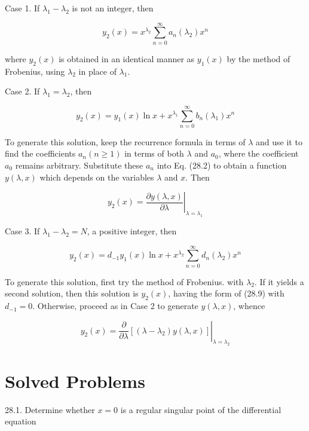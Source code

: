 \documentclass[10pt]{article}
\begin{document}
Case 1. If $\lambda_{1}-\lambda_{2}$ is not an integer, then


\begin{equation*}
y_{2}(x)=x^{\lambda_{2}} \sum_{n=0}^{\infty} a_{n}\left(\lambda_{2}\right) x^{n} \tag{28.6}
\end{equation*}


where $y_{2}(x)$ is obtained in an identical manner as $y_{1}(x)$ by the method of Frobenius, using $\lambda_{2}$ in place of $\lambda_{1}$.

Case 2. If $\lambda_{1}=\lambda_{2}$, then


\begin{equation*}
y_{2}(x)=y_{1}(x) \ln x+x^{\lambda_{1}} \sum_{n=0}^{\infty} b_{n}\left(\lambda_{1}\right) x^{n} \tag{28.7}
\end{equation*}


To generate this solution, keep the recurrence formula in terms of $\lambda$ and use it to find the coefficients $a_{n}(n \geq 1)$ in terms of both $\lambda$ and $a_{0}$, where the coefficient $a_{0}$ remains arbitrary. Substitute these $a_{n}$ into Eq. (28.2) to obtain a function $y(\lambda, x)$ which depends on the variables $\lambda$ and $x$. Then


\begin{equation*}
y_{2}(x)=\left.\frac{\partial y(\lambda, x)}{\partial \lambda}\right|_{\lambda=\lambda_{1}} \tag{28.8}
\end{equation*}


Case 3. If $\lambda_{1}-\lambda_{2}=N$, a positive integer, then


\begin{equation*}
y_{2}(x)=d_{-1} y_{1}(x) \ln x+x^{\lambda_{2}} \sum_{n=0}^{\infty} d_{n}\left(\lambda_{2}\right) x^{n} \tag{28.9}
\end{equation*}


To generate this solution, first try the method of Frobenius. with $\lambda_{2}$. If it yields a second solution, then this solution is $y_{2}(x)$, having the form of (28.9) with $d_{-1}=0$. Otherwise, proceed as in Case 2 to generate $y(\lambda, x)$, whence


\begin{equation*}
y_{2}(x)=\left.\frac{\partial}{\partial \lambda}\left[\left(\lambda-\lambda_{2}\right) y(\lambda, x)\right]\right|_{\lambda=\lambda_{2}} \tag{28.10}
\end{equation*}


\section*{Solved Problems}
28.1. Determine whether $x=0$ is a regular singular point of the differential equation
\end{document}
